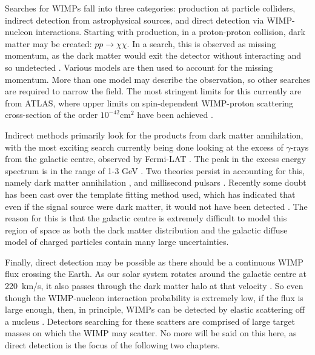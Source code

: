 \par
Searches for WIMPs fall into three categories: production at particle colliders, indirect detection from astrophysical sources, and direct detection via WIMP-nucleon interactions.
Starting with production, in a proton-proton collision, dark matter may be created: $pp\xrightarrow{}\chi\chi$.
In a search, this is observed as missing momentum, as the dark matter would exit the detector without interacting and so undetected \cite{lhc_darkmatter_ref}.
Various models are then used to account for the missing momentum.
More than one model may describe the observation, so other searches are required to narrow the field.
The most stringent limits for this currently are from ATLAS, where upper limits on spin-dependent WIMP-proton scattering cross-section of the order $10^{-42}$cm$^{2}$ have been achieved \cite{atlas_wimp_ref}.
\par
Indirect methods primarily look for the products from dark matter annihilation, with the most exciting search currently being done looking at the excess of $\gamma$-rays from the galactic centre, observed by Fermi-LAT \cite{fermi_lat_excess_ref}.
The peak in the excess energy spectrum is in the range of 1-3 GeV \cite{galactic_excess_peak_ref}.
Two theories persist in accounting for this, namely dark matter annihilation \cite{galactic_gamma_excess_1_ref, galactic_gamma_excess_2_ref}, and millisecond pulsars \cite{galactic_gamma_excess_3_ref, galactic_gamma_excess_4_ref}.
Recently some doubt has been cast over the template fitting method used, which has indicated that even if the signal source were dark matter, it would not have been detected \cite{galactic_gamma_excess_5_ref}.
The reason for this is that the galactic centre is extremely difficult to model this region of space as both the dark matter distribution and the galactic diffuse model of charged particles contain many large uncertainties.
\par
Finally, direct detection may be possible as there should be a continuous WIMP flux crossing the Earth.
As our solar system rotates around the galactic centre at 220~km/s, it also passes through the dark matter halo at that velocity \cite{wimp_theory_ref}. 
So even though the WIMP-nucleon interaction probability is extremely low, if the flux is large enough, then, in principle, WIMPs can be detected by elastic scattering off a nucleus \cite{wimp_nucleon_interactions_first_suggestion_ref,supersymmetric_dark_matter_ref}.
Detectors searching for these scatters are comprised of large target masses on which the WIMP may scatter.
No more will be said on this here, as direct detection is the focus of the following two chapters.

